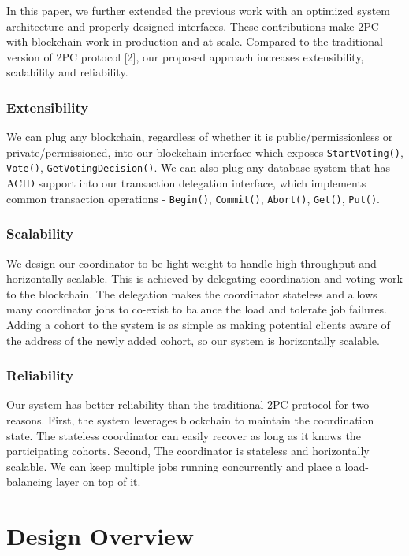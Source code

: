 \documentclass[11pt,conference]{IEEEtran}
\begin{document}
In this paper, we further extended the previous work with an optimized system architecture and properly designed interfaces. These contributions make 2PC with blockchain work in production and at scale. Compared to the traditional version of 2PC protocol [2], our proposed approach increases extensibility, scalability and reliability.


\subsubsection{Extensibility}
We can plug any blockchain, regardless of whether it is public/permissionless or private/permissioned, into our blockchain interface which exposes \texttt{StartVoting()}, \texttt{Vote()}, \texttt{GetVotingDecision()}. We can also plug any database system that has ACID support into our transaction delegation interface, which implements common transaction operations - \texttt{Begin()}, \texttt{Commit()}, \texttt{Abort()}, \texttt{Get()}, \texttt{Put()}.

\subsubsection{Scalability}
We design our coordinator  to be light-weight to handle high throughput and horizontally scalable. This is achieved by delegating coordination and voting work to the blockchain. The delegation makes the coordinator stateless and allows many coordinator jobs to co-exist to balance the load and tolerate job failures. Adding a cohort to the system is as simple as making potential clients aware of the address of the newly added cohort, so our system is horizontally scalable.

\subsubsection{Reliability}
Our system has better reliability than the traditional 2PC protocol for two reasons. First, the system leverages blockchain to maintain the coordination state. The stateless coordinator can easily recover as long as it knows the participating cohorts. Second, The coordinator is stateless and horizontally scalable. We can keep multiple jobs running concurrently and place a load-balancing layer on top of it. 

\section{Design Overview}
\end{document}

